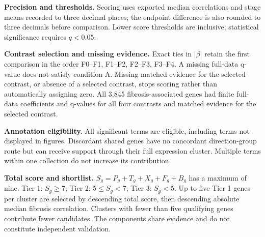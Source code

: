 \small
\textbf{Precision and thresholds.} Scoring uses exported median correlations and stage means recorded to three decimal places; the endpoint difference is also rounded to three decimals before comparison. Lower score thresholds are inclusive; statistical significance requires $q<0.05$.

\textbf{Contrast selection and missing evidence.} Exact ties in $|\beta|$ retain the first comparison in the order F0--F1, F1--F2, F2--F3, F3--F4. A missing full-data q-value does not satisfy condition A. Missing matched evidence for the selected contrast, or absence of a selected contrast, stops scoring rather than automatically assigning zero. All 3,845 fibrosis-associated genes had finite full-data coefficients and q-values for all four contrasts and matched evidence for the selected contrast.

\textbf{Annotation eligibility.} All significant terms are eligible, including terms not displayed in figures. Discordant shared genes have no concordant direction-group route but can receive support through their full expression cluster. Multiple terms within one collection do not increase its contribution.

\textbf{Total score and shortlist.} $S_g=P_g+T_g+X_g+F_g+B_g$ has a maximum of nine. Tier 1: $S_g\geq7$; Tier 2: $5\leq S_g<7$; Tier 3: $S_g<5$. Up to five Tier 1 genes per cluster are selected by descending total score, then descending absolute median fibrosis correlation. Clusters with fewer than five qualifying genes contribute fewer candidates. The components share evidence and do not constitute independent validation.
\endgroup

